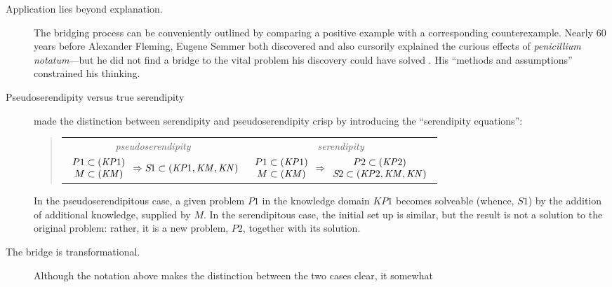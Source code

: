  \begin{description}
 \item[Application lies beyond explanation.]
   The bridging process can be
   conveniently outlined by comparing a positive example with a
   corresponding counterexample.  Nearly 60 years before Alexander Fleming,
   Eugene Semmer both discovered and also cursorily explained the
   curious effects of \emph{penicillium notatum}---but he did not find
   a bridge to the vital problem his discovery could have solved
   \cite[p.~75]{cropley2013creativity}.  His ``methods and
   assumptions'' \cite[p.~131]{floppyearedrabbits1958barber}
   constrained his thinking.
 \item[Pseudoserendipity versus true serendipity]
   \citet[p.~3]{Figueiredo2001} made the distinction between
   serendipity and pseudoserendipity  crisp by introducing
   the ``serendipity equations'':
 \begin{quote}
 \begin{tabular}{cc}
 \emph{pseudoserendipity} & \emph{serendipity}\\
 $\begin{array}{c}
 P1 \subset (\mathit{KP}1)\\
 M \subset (\mathit{KM})
 \end{array} \Rightarrow S\hspace{-.12em}1 \subset (\mathit{KP}1, \mathit{KM}, \mathit{KN})$
 &
 $\begin{array}{c}
 P1 \subset (\mathit{KP}1)\\
 M \subset (\mathit{KM})
 \end{array} \Rightarrow
 \begin{array}{c}
 P2 \subset (\mathit{KP}2)\\
 S\hspace{-.1em}2 \subset (\mathit{KP}2, \mathit{KM}, \mathit{KN})
 \end{array}$
 \end{tabular}
 \end{quote}
 In the pseudoserendipitous case, a given problem $P1$ in the knowledge
 domain $\mathit{KP}1$ becomes solveable (whence, $S1$) by the addition of
 additional knowledge, supplied by $M$.  In the serendipitous case, the
 initial set up is similar, but the result is not a solution to the
 original problem: rather, it is a new problem, $P2$, together with its
 solution.
 \item[The bridge is transformational.]  Although the notation above
   makes the distinction between the two cases clear, it somewhat

\end{description}
